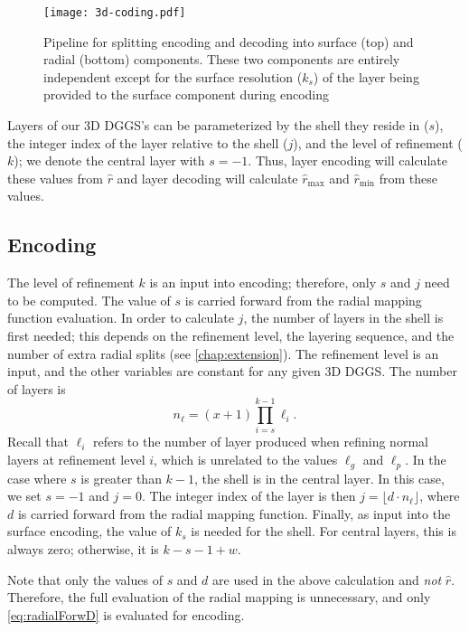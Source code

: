 \begin{figure}[htp!]
	\centering
	\texttt{[image: 3d-coding.pdf]}
	\caption[Pipeline for encoding and decoding with the grid extension method]{
		Pipeline for splitting encoding and decoding into surface (top) and radial (bottom) components.
		These two components are entirely independent except for the surface resolution ($k_s$) of the layer being provided to the surface component during encoding
	}
	\label{fig:prismatoid-coding}
\end{figure}


Layers of our 3D DGGS's can be parameterized by the shell they reside in ($s$), the integer index of the layer relative to the shell ($j$), and the level of refinement ($k$); we denote the central layer with $s = -1$.
Thus, layer encoding will calculate these values from $\hat{r}$ and layer decoding will calculate $\hat{r}_\mathrm{max}$ and $\hat{r}_\mathrm{min}$ from these values.


\subsection{Encoding}
The level of refinement $k$ is an input into encoding; therefore, only $s$ and $j$ need to be computed.
The value of $s$ is carried forward from the radial mapping function evaluation.
In order to calculate $j$, the number of layers in the shell is first needed; this depends on the refinement level, the layering sequence, and the number of extra radial splits (see \cref{chap:extension}).
The refinement level is an input, and the other variables are constant for any given 3D DGGS.
The number of layers is
%
\begin{equation*}
n_\ell = \left( x+1 \right) \prod_{i = s}^{k - 1} \ell_i.
\end{equation*}
%
Recall that $\ell_i$ refers to the number of layer produced when refining normal layers at refinement level $i$, which is unrelated to the values $\ell_g$ and $\ell_p$.
In the case where $s$ is greater than $k-1$, the shell is in the central layer.
In this case, we set $s = -1$ and $j = 0$.
The integer index of the layer is then $j = \lfloor d \cdot n_\ell \rfloor$, where $d$ is carried forward from the radial mapping function.
Finally, as input into the surface encoding, the value of $k_s$ is needed for the shell.
For central layers, this is always zero; otherwise, it is $k - s - 1 + w$.


Note that only the values of $s$ and $d$ are used in the above calculation and \textit{not} $\hat{r}$.
Therefore, the full evaluation of the radial mapping is unnecessary, and only \cref{eq:radialForwD} is evaluated for encoding.


